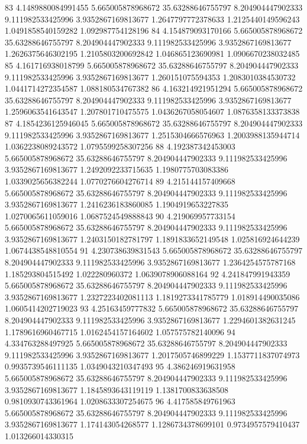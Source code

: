{83 4.1489880084991455 5.665005878968672 35.63288646755797 8.204904447902333 9.111982533425996 3.9352867169813677 1.2647797772378633 1.2125440149596243 1.0491858540159282 1.092987754128196
84 4.154879093170166 5.665005878968672 35.63288646755797 8.204904447902333 9.111982533425996 3.9352867169813677 1.2626375646302195 1.2105803200692842 1.046865123690981 1.0906670238032485
85 4.161716938018799 5.665005878968672 35.63288646755797 8.204904447902333 9.111982533425996 3.9352867169813677 1.260151075594353 1.2083010384530732 1.0441714272354587 1.088180534767382
86 4.163214921951294 5.665005878968672 35.63288646755797 8.204904447902333 9.111982533425996 3.9352867169813677 1.2596063541643547 1.207801710475575 1.0436267058054607 1.0876358133373838
87 4.1854236125946045 5.665005878968672 35.63288646755797 8.204904447902333 9.111982533425996 3.9352867169813677 1.2515304666576963 1.2003988135944714 1.0362238089243572 1.0795599258307256
88 4.192387342453003 5.665005878968672 35.63288646755797 8.204904447902333 9.111982533425996 3.9352867169813677 1.2492092233715635 1.1980775703083386 1.0339025656382244 1.0770276604276714
89 4.215144157409668 5.665005878968672 35.63288646755797 8.204904447902333 9.111982533425996 3.9352867169813677 1.2416236183860085 1.1904919653227835 1.0270065611059016 1.0687524549888843
90 4.219069957733154 5.665005878968672 35.63288646755797 8.204904447902333 9.111982533425996 3.9352867169813677 1.2403150182781797 1.1891833652149548 1.025816924644239 1.0674438548810554
91 4.230738639831543 5.665005878968672 35.63288646755797 8.204904447902333 9.111982533425996 3.9352867169813677 1.2364254575787168 1.185293804515492 1.022280960372 1.0639078906088164
92 4.241847991943359 5.665005878968672 35.63288646755797 8.204904447902333 9.111982533425996 3.9352867169813677 1.2327223402081113 1.1819273341785779 1.018914490035086 1.0605414202719023
93 4.25163459777832 5.665005878968672 35.63288646755797 8.204904447902333 9.111982533425996 3.9352867169813677 1.2294601382631245 1.1789616960467715 1.0162454157164602 1.057575782140096
94 4.334763288497925 5.665005878968672 35.63288646755797 8.204904447902333 9.111982533425996 3.9352867169813677 1.2017505746899229 1.1537711837074973 0.9935739546111135 1.0349043210347493
95 4.386246919631958 5.665005878968672 35.63288646755797 8.204904447902333 9.111982533425996 3.9352867169813677 1.1845893643119119 1.1381700833638508 0.9810930743361964 1.0208633307254675
96 4.417585849761963 5.665005878968672 35.63288646755797 8.204904447902333 9.111982533425996 3.9352867169813677 1.174143054268577 1.1286734378699101 0.9734957579410437 1.013266014330315
}
